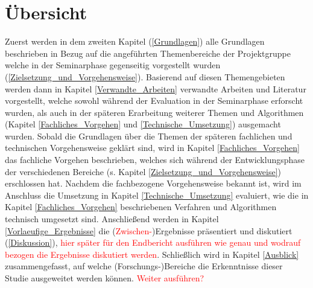 \section{Übersicht}

Zuerst werden in dem zweiten Kapitel (\ref{Grundlagen}) alle Grundlagen beschrieben in Bezug auf die angeführten Themenbereiche der Projektgruppe welche in der Seminarphase gegenseitig vorgestellt wurden (\ref{Zielsetzung_und_Vorgehensweise}). Basierend auf diesen Themengebieten werden dann in Kapitel \ref{Verwandte_Arbeiten} verwandte Arbeiten und Literatur vorgestellt, welche sowohl während der Evaluation in der Seminarphase erforscht wurden, als auch in der späteren Erarbeitung weiterer Themen und Algorithmen (Kapitel \ref{Fachliches_Vorgehen} und \ref{Technische_Umsetzung}) ausgemacht wurden. Sobald die Grundlagen über die Themen der späteren fachlichen und technischen Vorgehensweise geklärt sind, wird in Kapitel \ref{Fachliches_Vorgehen} das fachliche Vorgehen beschrieben, welches sich während der Entwicklungsphase der verschiedenen Bereiche (s. Kapitel \ref{Zielsetzung_und_Vorgehensweise}) erschlossen hat. Nachdem die fachbezogene Vorgehensweise bekannt ist, wird im Anschluss die Umsetzung in Kapitel \ref{Technische_Umsetzung} evaluiert, wie die in Kapitel \ref{Fachliches_Vorgehen} beschriebenen Verfahren und Algorithmen technisch umgesetzt sind. Anschließend werden in Kapitel \ref{Vorlaeufige_Ergebnisse} die (\textcolor{red}{Zwischen-})Ergebnisse präsentiert und diskutiert (\ref{Diskussion}), \textcolor{red}{hier später für den Endbericht ausführen wie genau und wodrauf bezogen die Ergebnisse diskutiert werden}. Schließlich wird in Kapitel \ref{Ausblick} zusammengefasst, auf welche (Forschungs-)Bereiche die Erkenntnisse dieser Studie ausgeweitet werden können. \textcolor{red}{Weiter ausführen?}